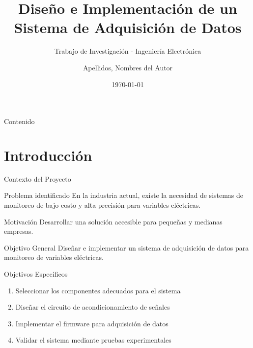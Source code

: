 \documentclass[11pt, spanish, aspectratio=169]{beamer}
\title[Diseño de Sistema]{Diseño e Implementación de un Sistema de Adquisición de Datos}
\subtitle{Trabajo de Investigación - Ingeniería Electrónica}
\author[Autor]{Apellidos, Nombres del Autor}
\institute[UNTELS]{Universidad Nacional Tecnológica de Lima Sur}
\date{\today}
\begin{document}
\begin{frame}
    \titlepage
\end{frame}

\begin{frame}{Contenido}
    \tableofcontents
\end{frame}

\section{Introducción}

\begin{frame}{Contexto del Proyecto}
    \begin{block}{Problema identificado}
        En la industria actual, existe la necesidad de sistemas de monitoreo de bajo costo y alta precisión para variables eléctricas.
    \end{block}
    
    \begin{alertblock}{Motivación}
        Desarrollar una solución accesible para pequeñas y medianas empresas.
    \end{alertblock}
    
    \begin{exampleblock}{Objetivo General}
        Diseñar e implementar un sistema de adquisición de datos para monitoreo de variables eléctricas.
    \end{exampleblock}
\end{frame}

\begin{frame}{Objetivos Específicos}
    \begin{enumerate}
        \item Seleccionar los componentes adecuados para el sistema
        \item Diseñar el circuito de acondicionamiento de señales
        \item Implementar el firmware para adquisición de datos
        \item Validar el sistema mediante pruebas experimentales
    \end{enumerate}
\end{frame}
\end{document}
